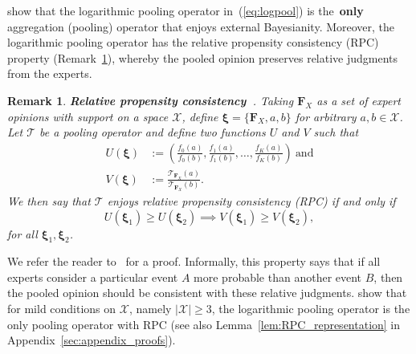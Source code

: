 \documentclass[a4paper, notitlepage, 11pt]{article}
\newtheorem{remark}{Remark}[]
\begin{document}
\cite{Genest1984} show that the logarithmic pooling operator in~(\ref{eq:logpool}) is the~\textbf{only} aggregation (pooling) operator that enjoys external Bayesianity.
Moreover, the logarithmic pooling operator has the relative propensity consistency (RPC) property (Remark~\ref{rmk:properties_RPC}), whereby the pooled opinion preserves relative judgments from the experts.
\begin{remark}
\label{rmk:properties_RPC}
\textbf{Relative propensity consistency~\citep{Genest1984}}.
Taking $\boldsymbol F_{X}$ as a set of expert opinions with support on a space $\mathcal{X}$, define $\boldsymbol \xi = \{\boldsymbol F_{X}, a, b\}$ for arbitrary $a , b \in \mathcal{X}$.
Let $\mathcal{T}$ be a pooling operator and define two functions $U$ and $V$ such that 
\begin{align}
 U(\boldsymbol \xi) &:= \left( \frac{f_0(a)}{f_0(b)}, \frac{f_1(a)}{f_1(b)}, \ldots, \frac{f_K(a)}{f_K(b)} \right)\:\text{and}\\
 V(\boldsymbol \xi) & := \frac{\mathcal{T}_{\boldsymbol F_{X}} (a)}{\mathcal{T}_{\boldsymbol F_{X}} (b)}.
\end{align}
We then say that $\mathcal{T}$ enjoys \textit{relative propensity consistency} (RPC) if and only if
\begin{equation}
 U(\boldsymbol \xi_1) \geq U(\boldsymbol \xi_2) \implies  V(\boldsymbol \xi_1) \geq V(\boldsymbol \xi_2),
\end{equation}
for all $\boldsymbol \xi_1, \boldsymbol \xi_2$.
\end{remark}
We refer the reader to~\cite{Genest1984} for a proof.
Informally, this property says that if all experts consider a particular event $A$ more probable than another event $B$, then the pooled opinion should be consistent with these relative judgments. 
\cite{Genest1984} show that for mild conditions on $\mathcal{X}$, namely $|\mathcal{X}| \geq 3$, the logarithmic pooling operator is the only pooling operator with RPC (see also Lemma~\ref{lem:RPC_representation} in Appendix~\ref{sec:appendix_proofs}).
\end{document}
